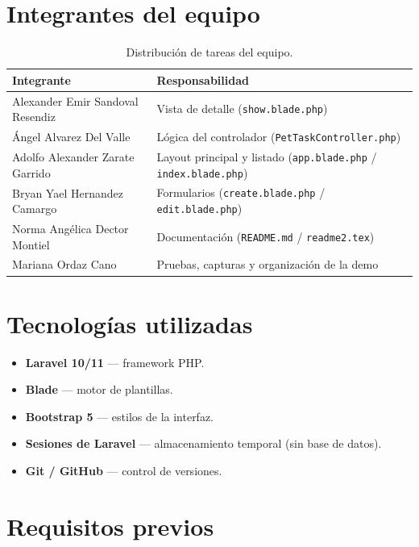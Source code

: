 \documentclass[11pt,a4paper]{article}
\begin{document}
\section{Integrantes del equipo}

\begin{table}[H]
\centering
\renewcommand{\arraystretch}{1.3}
\begin{tabular}{|l|l|}
\hline
\textbf{Integrante} & \textbf{Responsabilidad} \\ \hline
Alexander Emir Sandoval Resendiz      & Vista de detalle (\texttt{show.blade.php}) \\ \hline
Ángel Alvarez Del Valle               & Lógica del controlador (\texttt{PetTaskController.php}) \\ \hline
Adolfo Alexander Zarate Garrido       & Layout principal y listado (\texttt{app.blade.php} / \texttt{index.blade.php}) \\ \hline
Bryan Yael Hernandez Camargo          & Formularios (\texttt{create.blade.php} / \texttt{edit.blade.php}) \\ \hline
Norma Angélica Dector Montiel         & Documentación (\texttt{README.md} / \texttt{readme2.tex}) \\ \hline
Mariana Ordaz Cano                    & Pruebas, capturas y organización de la demo \\ \hline
\end{tabular}
\caption{Distribución de tareas del equipo.}
\end{table}

\section{Tecnologías utilizadas}

\begin{itemize}[leftmargin=1.5em]
    \item \textbf{Laravel 10/11} --- framework PHP.
    \item \textbf{Blade} --- motor de plantillas.
    \item \textbf{Bootstrap 5} --- estilos de la interfaz.
    \item \textbf{Sesiones de Laravel} --- almacenamiento temporal (sin base de datos).
    \item \textbf{Git / GitHub} --- control de versiones.
\end{itemize}

\section{Requisitos previos}
\end{document}
